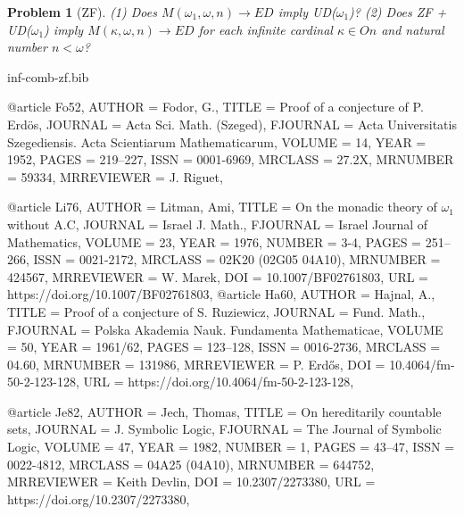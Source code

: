 \documentclass[a4paper,10pt,reqno]{amsart}
\numberwithin{equation}{section}
\newtheorem{problem}[theorem]{Problem}
\theoremstyle{definition}
\theoremstyle{remark}
\begin{document}
\begin{problem}[ZF]\label{pr:ud2ed}
    (1)  Does $M({\omega}_1,  {\omega},n)\to ED$   imply  UD(${\omega}_1$)?
    (2)    Does ZF + UD(${\omega}_1$) imply  
    $M({\kappa},  {\omega},n)\to ED$ for each infinite cardinal ${\kappa}\in On $ 
    and natural number  $n<{\omega}$?

\end{problem}
    


    

 
       
      


  
\begin{filecontents}[overwrite]{inf-comb-zf.bib}
  
    @article {Fo52,  
    AUTHOR = {Fodor, G.},
     TITLE = {Proof of a conjecture of {P}. {E}rd\"{o}s},
   JOURNAL = {Acta Sci. Math. (Szeged)},
  FJOURNAL = {Acta Universitatis Szegediensis. Acta Scientiarum
              Mathematicarum},
    VOLUME = {14},
      YEAR = {1952},
     PAGES = {219--227},
      ISSN = {0001-6969},
   MRCLASS = {27.2X},
  MRNUMBER = {59334},
MRREVIEWER = {J. Riguet},
}



@article {Li76,
AUTHOR = {Litman, Ami},
 TITLE = {On the monadic theory of {$\omega _{1}$} without {A}.{C}},
JOURNAL = {Israel J. Math.},
FJOURNAL = {Israel Journal of Mathematics},
VOLUME = {23},
  YEAR = {1976},
NUMBER = {3-4},
 PAGES = {251--266},
  ISSN = {0021-2172},
MRCLASS = {02K20 (02G05 04A10)},
MRNUMBER = {424567},
MRREVIEWER = {W. Marek},
   DOI = {10.1007/BF02761803},
   URL = {https://doi.org/10.1007/BF02761803},
}
@article {Ha60,
    AUTHOR = {Hajnal, A.},
     TITLE = {Proof of a conjecture of {S}. {R}uziewicz},
   JOURNAL = {Fund. Math.},
  FJOURNAL = {Polska Akademia Nauk. Fundamenta Mathematicae},
    VOLUME = {50},
      YEAR = {1961/62},
     PAGES = {123--128},
      ISSN = {0016-2736},
   MRCLASS = {04.60},
  MRNUMBER = {131986},
MRREVIEWER = {P. Erd\H{o}s},
       DOI = {10.4064/fm-50-2-123-128},
       URL = {https://doi.org/10.4064/fm-50-2-123-128},
}
 

@article {Je82,
    AUTHOR = {Jech, Thomas},
     TITLE = {On hereditarily countable sets},
   JOURNAL = {J. Symbolic Logic},
  FJOURNAL = {The Journal of Symbolic Logic},
    VOLUME = {47},
      YEAR = {1982},
    NUMBER = {1},
     PAGES = {43--47},
      ISSN = {0022-4812},
   MRCLASS = {04A25 (04A10)},
  MRNUMBER = {644752},
MRREVIEWER = {Keith Devlin},
       DOI = {10.2307/2273380},
       URL = {https://doi.org/10.2307/2273380},
}



\end{filecontents}
\end{document}
